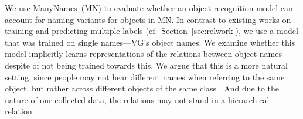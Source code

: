 %

%
We use ManyNames\ (MN) to evaluate whether an object recognition model can account for naming variants for objects in MN.
In contrast to existing works on training and predicting multiple labels
(cf.\ Section\ \ref{sec:relwork}), we use a model that was trained on single names---VG's object names. %
We examine whether this model implicitly learns representations of the relations between object names despite of not being trained towards this. 
We argue that this is a more natural setting, since people may not hear different names when referring to the same object, but rather across different objects of the same class \cite{frank2009using}.
And due to the nature of our collected data, the relations may not stand in a hierarchical relation. 


